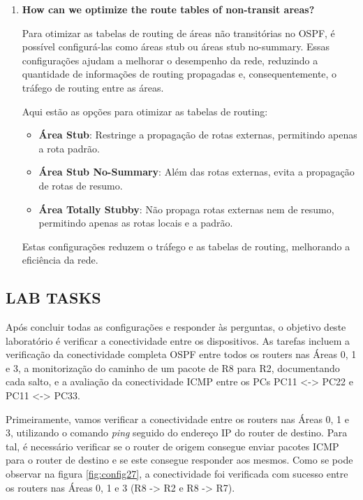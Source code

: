 \documentclass[11pt,english, openright, oneside]{book}
\begin{document}
\begin{enumerate}
  \item \textbf{How can we optimize the route tables of non-transit areas?}
  \vspace{0.2cm}

  \par Para otimizar as tabelas de routing de áreas não transitórias no OSPF, é possível configurá-las como áreas stub ou áreas stub no-summary. Essas configurações ajudam a melhorar o desempenho da rede, reduzindo a quantidade de informações de routing propagadas e, consequentemente, o tráfego de routing entre as áreas.

  \par Aqui estão as opções para otimizar as tabelas de routing:
  \vspace{0.2cm}

  \begin{itemize}
    \item \textbf{Área Stub}: Restringe a propagação de rotas externas, permitindo apenas a rota padrão.
    \item \textbf{Área Stub No-Summary}: Além das rotas externas, evita a propagação de rotas de resumo.
    \item \textbf{Área Totally Stubby}: Não propaga rotas externas nem de resumo, permitindo apenas as rotas locais e a padrão.
  \end{itemize}
  \vspace{0.2cm}

  \par Estas configurações reduzem o tráfego e as tabelas de routing, melhorando a eficiência da rede.
  \vspace{0.2cm}
  \end{enumerate}

\subsection{LAB TASKS}
\vspace{0.2cm}

\par Após concluir todas as configurações e responder às perguntas, o objetivo deste laboratório é verificar a conectividade entre os dispositivos. As tarefas incluem a verificação da conectividade completa OSPF entre todos os routers nas Áreas 0, 1 e 3, a monitorização do caminho de um pacote de R8 para R2, documentando cada salto, e a avaliação da conectividade ICMP entre os PCs PC11 <-> PC22 e PC11 <-> PC33.

\par Primeiramente, vamos verificar a conectividade entre os routers nas Áreas 0, 1 e 3, utilizando o comando \textit{ping} seguido do endereço IP do router de destino. Para tal, é necessário verificar se o router de origem consegue enviar pacotes ICMP para o router de destino e se este consegue responder aos mesmos. Como se pode observar na figura \ref{fig:config27}, a conectividade foi verificada com sucesso entre os routers nas Áreas 0, 1 e 3 (R8 -> R2 e R8 -> R7).
\end{document}
